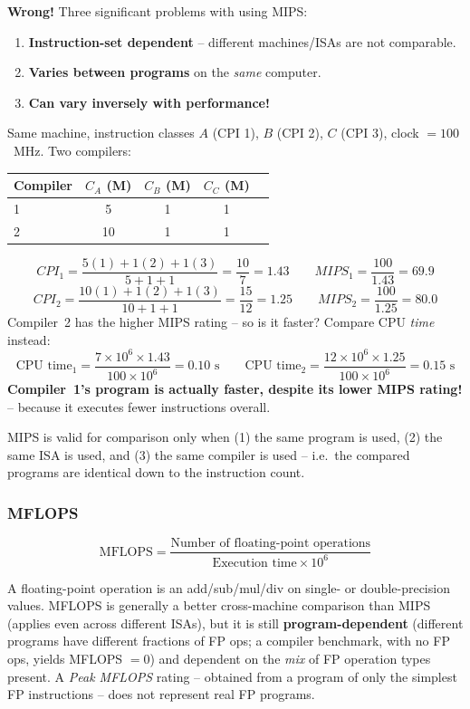 \textbf{Wrong!} Three significant problems with using MIPS:
\begin{enumerate}
  \item \textbf{Instruction-set dependent} -- different machines/ISAs are
  not comparable.
  \item \textbf{Varies between programs} on the \emph{same} computer.
  \item \textbf{Can vary inversely with performance!}
\end{enumerate}

\begin{eg}
Same machine, instruction classes $A$ (CPI 1), $B$ (CPI 2), $C$ (CPI 3),
clock $=100$~MHz. Two compilers:
\begin{center}
\begin{tabular}{@{}lcccc@{}}
\toprule
Compiler & $C_A$ (M) & $C_B$ (M) & $C_C$ (M) \\
\midrule
1 & 5  & 1 & 1 \\
2 & 10 & 1 & 1 \\
\bottomrule
\end{tabular}
\end{center}
\[
  CPI_1 = \frac{5(1)+1(2)+1(3)}{5+1+1} = \frac{10}{7} = 1.43
  \qquad MIPS_1 = \frac{100}{1.43} = 69.9
\]
\[
  CPI_2 = \frac{10(1)+1(2)+1(3)}{10+1+1} = \frac{15}{12} = 1.25
  \qquad MIPS_2 = \frac{100}{1.25} = 80.0
\]
Compiler~2 has the higher MIPS rating -- so is it faster? Compare CPU
\emph{time} instead:
\[
  \text{CPU time}_1 = \frac{7\times10^6\times1.43}{100\times10^6} = 0.10\text{ s}
  \qquad
  \text{CPU time}_2 = \frac{12\times10^6\times1.25}{100\times10^6} = 0.15\text{ s}
\]
\textbf{Compiler~1's program is actually faster, despite its lower MIPS
rating!} -- because it executes fewer instructions overall.
\end{eg}

\begin{note}
MIPS is valid for comparison only when (1) the same program is used, (2) the
same ISA is used, and (3) the same compiler is used -- i.e.\ the compared
programs are identical down to the instruction count.
\end{note}

\subsubsection{MFLOPS}
\begin{definition}
\[
  \text{MFLOPS} = \frac{\text{Number of floating-point operations}}
  {\text{Execution time} \times 10^6}
\]
\end{definition}
A floating-point operation is an add/sub/mul/div on single- or
double-precision values. MFLOPS is generally a better cross-machine
comparison than MIPS (applies even across different ISAs), but it is still
\textbf{program-dependent} (different programs have different fractions of
FP ops; a compiler benchmark, with no FP ops, yields MFLOPS $=0$) and
dependent on the \emph{mix} of FP operation types present. A \emph{Peak
MFLOPS} rating -- obtained from a program of only the simplest FP
instructions -- does not represent real FP programs.

